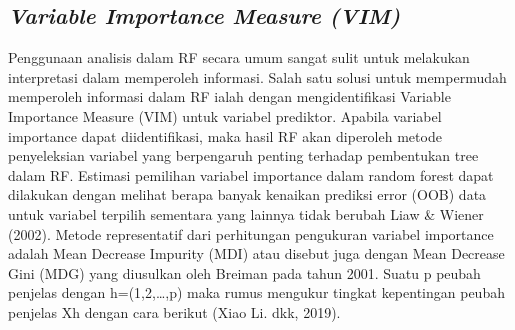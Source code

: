 \subsection{\textit{Variable Importance Measure (VIM)}}
Penggunaan analisis dalam RF secara umum sangat sulit untuk melakukan interpretasi dalam memperoleh informasi. Salah satu solusi untuk mempermudah memperoleh informasi dalam RF ialah dengan mengidentifikasi Variable Importance Measure (VIM) untuk variabel prediktor. Apabila variabel importance dapat diidentifikasi, maka hasil RF akan diperoleh metode penyeleksian variabel yang berpengaruh penting terhadap pembentukan tree dalam RF. Estimasi pemilihan variabel importance dalam random forest dapat dilakukan dengan melihat berapa banyak kenaikan prediksi error (OOB) data untuk variabel terpilih sementara yang lainnya tidak berubah Liaw \& Wiener (2002).
Metode representatif dari perhitungan pengukuran variabel importance adalah Mean Decrease Impurity (MDI) atau disebut juga dengan Mean Decrease Gini (MDG) yang diusulkan oleh Breiman pada tahun 2001. Suatu p peubah penjelas dengan h=(1,2,…,p) maka rumus mengukur tingkat kepentingan peubah penjelas Xh dengan cara berikut (Xiao Li. dkk, 2019).